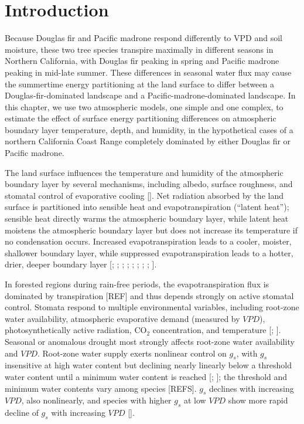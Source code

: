 \section{Introduction}

Because Douglas fir and Pacific madrone respond differently to VPD and soil moisture, these two tree species transpire maximally in different seasons in Northern California, with Douglas fir peaking in spring and Pacific madrone peaking in mid-late summer.  These differences in seasonal water flux may cause the summertime energy partitioning at the land surface to differ between a Douglas-fir-dominated landscape and a Pacific-madrone-dominated landscape.  In this chapter, we use two atmospheric models, one simple and one complex, to estimate the effect of surface energy partitioning differences on atmospheric boundary layer temperature, depth, and humidity, in the hypothetical cases of a northern California Coast Range completely dominated by either Douglas fir or Pacific madrone.

The land surface influences the temperature and humidity of the atmospheric boundary layer by several mechanisms, including albedo, surface roughness, and stomatal control of evaporative cooling [\cite{bonan}].  Net radiation absorbed by the land surface is partitioned into sensible heat and evapotranspiration (``latent heat''); sensible heat directly warms the atmospheric boundary layer, while latent heat moistens the atmospheric boundary layer but does not increase its temperature if no condensation occurs.  Increased evapotranspiration leads to a cooler, moister, shallower boundary layer, while suppressed evapotranspiration leads to a hotter, drier, deeper boundary layer [\cite{bonan}; \cite{seneviratne2010investigating}; \cite{de2012modelled}; \cite{fischer2007soil}; \cite{lobell2008effect}; \cite{mueller2012hot}; \cite{durre2000dependence}; \cite{hirschi2010observational}; \cite{Lee:2005kx}].  

In forested regions during rain-free periods, the evapotranspiration flux is dominated by transpiration [REF] and thus depends strongly on active stomatal control.  Stomata respond to multiple environmental variables, including root-zone water availability, atmospheric evaporative demand (measured by $VPD$), photosynthetically active radiation, CO$_2$ concentration, and temperature [\cite{jarvis1976interpretation}; \cite{collatz1991physiological}].  Seasonal or anomalous drought most strongly affects root-zone water availability and $VPD$.  Root-zone water supply exerts nonlinear control on $g_s$, with $g_s$ insensitive at high water content but declining nearly linearly below a threshold water content until a minimum water content is reached [\cite{feddes}; \cite{chen2008observations}]; the threshold and minimum water contents vary among species [REFS].  $g_s$ declines with increasing $VPD$, also nonlinearly, and species with higher $g_s$ at low $VPD$ show more rapid decline of $g_s$ with increasing $VPD$ [\cite{oren1999survey}].

